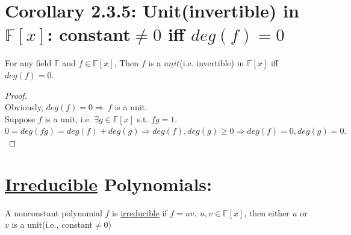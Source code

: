 \documentclass[11pt]{elegantbook}
\begin{document}
{\section{Corollary 2.3.5: Unit(invertible) in $\mathbb{F}[x]$: constant$\neq 0$ iff $deg(f)=0$}
\begin{corollary}[Corollary 2.3.5]
    For any field $\mathbb{F}$ and $f \in \mathbb{F}[x]$, Then $f$ is a $\underline{unit}$(i.e. invertible) in $\mathbb{F}[x]$ iff $deg(f)=0$.
\end{corollary}
\begin{proof}
\quad\\
Obviously, $deg(f)=0\Rightarrow\ f$ is a unit.\\
Suppose $f$ is a unit, i.e. $\exists g\in\mathbb{F}[x]$ s.t. $fg=1$.\\
$0=deg(fg)=deg(f)+deg(g)\Rightarrow deg(f),deg(g)\geq0\Rightarrow deg(f)=0,deg(g)=0.$
\end{proof}
\section{\underline{Irreducible} Polynomials:}
A nonconstant polynomial $f$ is \underline{irreducible} if $f=uv,\ u,v\in\mathbb{F}[x]$, then either $u$ or $v$ is a unit(i.e., constant$\neq0$)
}
\end{document}
